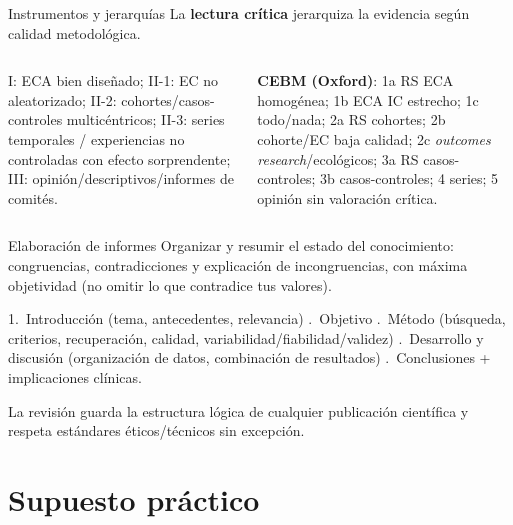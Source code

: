 \documentclass[aspectratio=169,8pt]{beamer}
\begin{document}
\begin{frame}{Instrumentos y jerarqu\'ias}
  \small
  La \textbf{lectura cr\'itica} jerarquiza la evidencia seg\'un calidad metodol\'ogica.
  \vspace{0.3em}
  \begin{columns}[T,onlytextwidth]
      \begin{tcolorbox}[formulabox,title=USPSTF (resumen)]
        \scriptsize
        I: ECA bien dise\~nado; II-1: EC no aleatorizado; II-2: cohortes/casos-controles multic\'entricos; II-3: series temporales / experiencias no controladas con efecto sorprendente; III: opini\'on/descriptivos/informes de comit\'es.
      \end{tcolorbox}
      \begin{tcolorbox}[tealbox]
        \scriptsize
        \textbf{CEBM (Oxford)}: 1a RS ECA homog\'enea; 1b ECA IC estrecho; 1c todo/nada; 2a RS cohortes; 2b cohorte/EC baja calidad; 2c \emph{outcomes research}/ecol\'ogicos; 3a RS casos-controles; 3b casos-controles; 4 series; 5 opini\'on sin valoraci\'on cr\'itica.
      \end{tcolorbox}
  \end{columns}
\end{frame}

\begin{frame}{Elaboraci\'on de informes}
  \small
  Organizar y resumir el estado del conocimiento: congruencias, contradicciones y explicaci\'on de incongruencias, con m\'axima objetividad (no omitir lo que contradice tus valores).
  \vspace{0.3em}
  \begin{tcolorbox}[infobox,title=Estructura recomendada]
    \scriptsize
    1.\ Introducci\'on (tema, antecedentes, relevancia) .\ Objetivo .\ M\'etodo (b\'usqueda, criterios, recuperaci\'on, calidad, variabilidad/fiabilidad/validez) .\ Desarrollo y discusi\'on (organizaci\'on de datos, combinaci\'on de resultados) .\ Conclusiones + implicaciones cl\'inicas.
  \end{tcolorbox}
  \vspace{0.3em}
  {\scriptsize La revisi\'on guarda la estructura l\'ogica de cualquier publicaci\'on cient\'ifica y respeta est\'andares \'eticos/t\'ecnicos sin excepci\'on.}
\end{frame}

\section{Supuesto pr\'actico}
\end{document}
